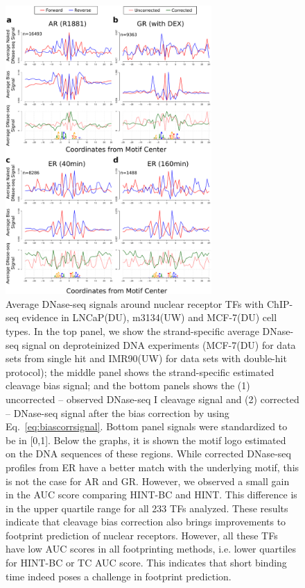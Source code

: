 \documentclass[11pt]{article}
\begin{document}
\begin{figure}[t!]
\centering
\includegraphics[width=0.7\textwidth]{Figs/Fig9.pdf}
\caption{Average DNase-seq signals around nuclear receptor TFs with ChIP-seq evidence in LNCaP(DU), m3134(UW) and MCF-7(DU) cell types. In the top panel, we show the strand-specific average DNase-seq signal on deproteinized DNA experiments (MCF-7(DU) for data sets from single hit and IMR90(UW) for data sets with double-hit protocol); the middle panel shows the strand-specific estimated cleavage bias signal; and the bottom panels shows the (1) uncorrected -- observed DNase-seq I cleavage signal and (2) corrected -- DNase-seq signal after the bias correction by using Eq.~\ref{eq:biascorrsignal}. Bottom panel signals were standardized to be in [0,1]. Below the graphs, it is shown the motif logo estimated on the DNA sequences of these regions. While corrected DNase-seq profiles from ER have a better match with the underlying motif, this is not the case for AR and GR. However, we observed a small gain in the AUC score comparing HINT-BC and HINT. This difference is in the upper quartile range for all 233 TFs analyzed. These results indicate that cleavage bias correction also brings improvements to footprint prediction of nuclear receptors. However, all these TFs have low AUC scores in all footprinting methods, i.e. lower quartiles for HINT-BC or TC AUC score. This indicates that short binding time indeed poses a challenge in footprint prediction.}
\label{fig:lineOBCsignal2}
\end{figure}
\end{document}
